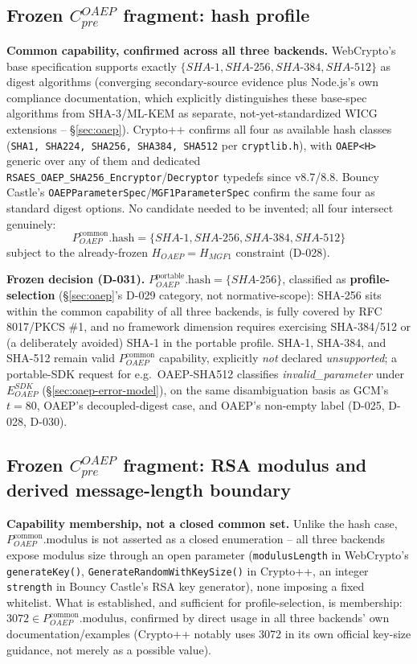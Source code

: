 \documentclass[11pt,a4paper]{article}
\begin{document}
\subsection{Frozen $C_{pre}^{OAEP}$ fragment: hash profile}\label{sec:oaep-hash}
\textbf{Common capability, confirmed across all three backends.} WebCrypto's base specification supports exactly $\{SHA\text{-}1, SHA\text{-}256, SHA\text{-}384, SHA\text{-}512\}$ as digest algorithms (converging secondary-source evidence plus Node.js's own compliance documentation, which explicitly distinguishes these base-spec algorithms from SHA-3/ML-KEM as separate, not-yet-standardized WICG extensions -- \S\ref{sec:oaep}). Crypto++ confirms all four as available hash classes (\texttt{SHA1, SHA224, SHA256, SHA384, SHA512} per \texttt{cryptlib.h}), with \texttt{OAEP<H>} generic over any of them and dedicated \texttt{RSAES\_OAEP\_SHA256\_Encryptor}/\texttt{Decryptor} typedefs since v8.7/8.8. Bouncy Castle's \texttt{OAEPParameterSpec}/\texttt{MGF1ParameterSpec} confirm the same four as standard digest options. No candidate needed to be invented; all four intersect genuinely:
\[P_{OAEP}^{\text{common}}.\text{hash} = \{SHA\text{-}1, SHA\text{-}256, SHA\text{-}384, SHA\text{-}512\}\]
subject to the already-frozen $H_{OAEP}=H_{MGF1}$ constraint (D-028).

\textbf{Frozen decision (D-031).} $P_{OAEP}^{\text{portable}}.\text{hash} = \{SHA\text{-}256\}$, classified as \textbf{profile-selection} (\S\ref{sec:oaep}'s D-029 category, not normative-scope): SHA-256 sits within the common capability of all three backends, is fully covered by RFC 8017/PKCS \#1, and no framework dimension requires exercising SHA-384/512 or (a deliberately avoided) SHA-1 in the portable profile. SHA-1, SHA-384, and SHA-512 remain valid $P_{OAEP}^{\text{common}}$ capability, explicitly \emph{not} declared \emph{unsupported}; a portable-SDK request for e.g.\ OAEP-SHA512 classifies \emph{invalid\_parameter} under $E_{OAEP}^{SDK}$ (\S\ref{sec:oaep-error-model}), on the same disambiguation basis as GCM's $t=80$, OAEP's decoupled-digest case, and OAEP's non-empty label (D-025, D-028, D-030).

\subsection{Frozen $C_{pre}^{OAEP}$ fragment: RSA modulus and derived message-length boundary}\label{sec:oaep-modulus}
\textbf{Capability membership, not a closed common set.} Unlike the hash case, $P_{OAEP}^{\text{common}}.\text{modulus}$ is not asserted as a closed enumeration -- all three backends expose modulus size through an open parameter (\texttt{modulusLength} in WebCrypto's \texttt{generateKey()}, \texttt{GenerateRandomWithKeySize()} in Crypto++, an integer \texttt{strength} in Bouncy Castle's RSA key generator), none imposing a fixed whitelist. What is established, and sufficient for profile-selection, is membership: $3072 \in P_{OAEP}^{\text{common}}.\text{modulus}$, confirmed by direct usage in all three backends' own documentation/examples (Crypto++ notably uses 3072 in its own official key-size guidance, not merely as a possible value).
\end{document}
